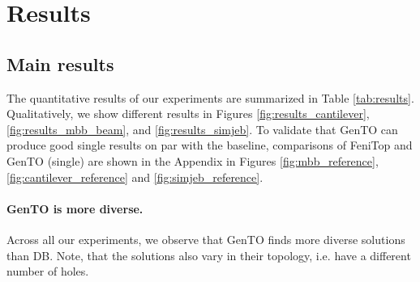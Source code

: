 \fi



\section{Results}
\label{sec:results}


\subsection{Main results}

The quantitative results of our experiments are summarized in Table \ref{tab:results}.
Qualitatively, we show different results in Figures \ref{fig:results_cantilever}, \ref{fig:results_mbb_beam},  and \ref{fig:results_simjeb}. To validate that GenTO can produce good single results on par with the baseline, comparisons of FeniTop and GenTO (single) are shown in the Appendix in Figures \ref{fig:mbb_reference}, \ref{fig:cantilever_reference} and \ref{fig:simjeb_reference}.

\paragraph{GenTO is more diverse.}
Across all our experiments, we observe that GenTO finds more diverse solutions than DB.
Note, that the solutions also vary in their topology, i.e. have a different number of holes.


